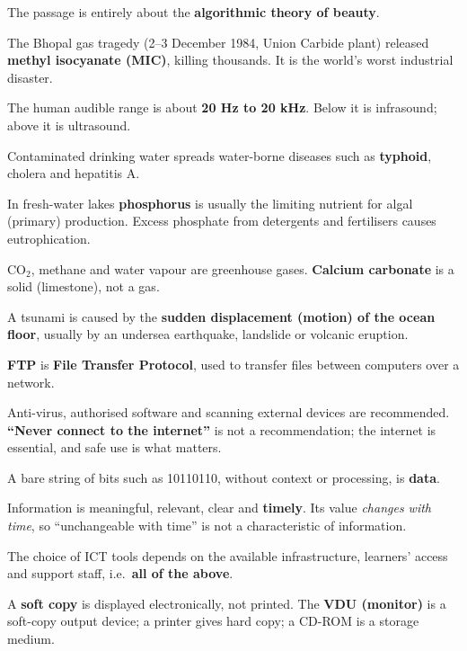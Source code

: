 The passage is entirely about the \textbf{algorithmic theory of beauty}.

The Bhopal gas tragedy (2--3 December 1984, Union Carbide plant) released \textbf{methyl isocyanate (MIC)}, killing thousands. It is the world's worst industrial disaster.

The human audible range is about \textbf{20 Hz to 20 kHz}. Below it is infrasound; above it is ultrasound.

Contaminated drinking water spreads water-borne diseases such as \textbf{typhoid}, cholera and hepatitis A.

In fresh-water lakes \textbf{phosphorus} is usually the limiting nutrient for algal (primary) production. Excess phosphate from detergents and fertilisers causes eutrophication.

CO$_2$, methane and water vapour are greenhouse gases. \textbf{Calcium carbonate} is a solid (limestone), not a gas.

A tsunami is caused by the \textbf{sudden displacement (motion) of the ocean floor}, usually by an undersea earthquake, landslide or volcanic eruption.

\textbf{FTP} is \textbf{File Transfer Protocol}, used to transfer files between computers over a network.

Anti-virus, authorised software and scanning external devices are recommended. \textbf{``Never connect to the internet''} is not a recommendation; the internet is essential, and safe use is what matters.

A bare string of bits such as 10110110, without context or processing, is \textbf{data}.

Information is meaningful, relevant, clear and \textbf{timely}. Its value \emph{changes with time}, so ``unchangeable with time'' is not a characteristic of information.

The choice of ICT tools depends on the available infrastructure, learners' access and support staff, i.e.\ \textbf{all of the above}.

A \textbf{soft copy} is displayed electronically, not printed. The \textbf{VDU (monitor)} is a soft-copy output device; a printer gives hard copy; a CD-ROM is a storage medium.

